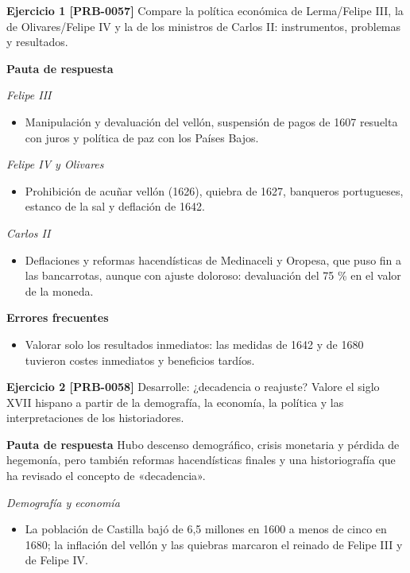 \documentclass{book}
\begin{document}
\noindent\textbf{Ejercicio 1 [PRB-0057]}
Compare la política económica de Lerma/Felipe III, la de Olivares/Felipe IV y la de los ministros de Carlos II: instrumentos, problemas y resultados.


\noindent\textbf{Pauta de respuesta}

\noindent\textit{Felipe III}
\begin{itemize}
\item Manipulación y devaluación del vellón, suspensión de pagos de 1607 resuelta con juros y política de paz con los Países Bajos.
\end{itemize}

\noindent\textit{Felipe IV y Olivares}
\begin{itemize}
\item Prohibición de acuñar vellón (1626), quiebra de 1627, banqueros portugueses, estanco de la sal y deflación de 1642.
\end{itemize}

\noindent\textit{Carlos II}
\begin{itemize}
\item Deflaciones y reformas hacendísticas de Medinaceli y Oropesa, que puso fin a las bancarrotas, aunque con ajuste doloroso: devaluación del 75 \% en el valor de la moneda.
\end{itemize}

\noindent\textbf{Errores frecuentes}
\begin{itemize}
\item Valorar solo los resultados inmediatos: las medidas de 1642 y de 1680 tuvieron costes inmediatos y beneficios tardíos.
\end{itemize}

\noindent\textbf{Ejercicio 2 [PRB-0058]}
Desarrolle: ¿decadencia o reajuste? Valore el siglo XVII hispano a partir de la demografía, la economía, la política y las interpretaciones de los historiadores.


\noindent\textbf{Pauta de respuesta}
Hubo descenso demográfico, crisis monetaria y pérdida de hegemonía, pero también reformas hacendísticas finales y una historiografía que ha revisado el concepto de «decadencia».


\noindent\textit{Demografía y economía}
\begin{itemize}
\item La población de Castilla bajó de 6,5 millones en 1600 a menos de cinco en 1680; la inflación del vellón y las quiebras marcaron el reinado de Felipe III y de Felipe IV.
\end{itemize}
\end{document}
